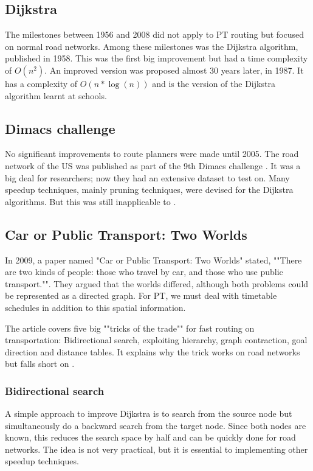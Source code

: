 \subsection{Dijkstra}
The milestones between 1956 and 2008 did not apply to PT routing but focused on normal road networks. Among these milestones was the Dijkstra algorithm, published in 1958. This was the first big improvement but had a time complexity of $O(n^2)$. An improved version was proposed almost 30 years later, in 1987. It has a complexity of $O(n*\log(n))$ and is the version of the Dijkstra algorithm learnt at schools.%
\subsection{Dimacs challenge}
No significant improvements to route planners were made until 2005. The road network of the US was published as part of the 9th Dimacs challenge \cite{noauthor_9th_2017}. It was a big deal for researchers; now they had an extensive dataset to test on. Many speedup techniques, mainly pruning techniques, were devised for the Dijkstra algorithms. But this was still inapplicable to .

\subsection{Car or Public Transport: Two Worlds}
In 2009, a paper named "Car or Public Transport: Two Worlds" \cite{bast_car_2009} stated, ""There are two kinds of people: those who travel by car, and those who use public transport."". They argued that the worlds differed, although both problems could be represented as a directed graph. For PT, we must deal with timetable schedules in addition to this spatial information.

The article covers five big ""tricks of the trade"" for fast routing on transportation: Bidirectional search, exploiting hierarchy, graph contraction, goal direction and distance tables. It explains why the trick works on road networks but falls short on .

\subsubsection{Bidirectional search}
A simple approach to improve Dijkstra is to search from the source node but simultaneously do a backward search from the target node. Since both nodes are known, this reduces the search space by half and can be quickly done for road networks. The idea is not very practical, but it is essential to implementing other speedup techniques.


